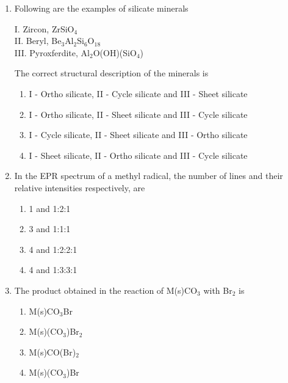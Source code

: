 \documentclass[journal,12pt,onecolumn]{IEEEtran}
\theoremstyle{remark}
\begin{document}
\begin{enumerate}
\item Following are the examples of silicate minerals \hfill{}

\begin{multicols}{3}
I. Zircon, ZrSiO\(_4\) \\
II. Beryl, Be\(_3\)Al\(_2\)Si\(_6\)O\(_{18}\) \\
III. Pyroxferdite, Al\(_2\)O(OH)(SiO\(_4\)) \\
\end{multicols}

The correct structural description of the minerals is

\begin{enumerate}
\item  I - Ortho silicate, II - Cycle silicate and III - Sheet silicate
\item  I - Ortho silicate, II - Sheet silicate and III - Cycle silicate
\item  I - Cycle silicate, II - Sheet silicate and III - Ortho silicate
\item  I - Sheet silicate, II - Ortho silicate and III - Cycle silicate
\end{enumerate}


\item In the EPR spectrum of a methyl radical, the number of lines and their relative intensities respectively, are \hfill{}

\begin{enumerate}
\item  1 and 1:2:1
\item  3 and 1:1:1
\item  4 and 1:2:2:1
\item  4 and 1:3:3:1
\end{enumerate}


\item The product obtained in the reaction of M(s)CO\(_3\) with Br\(_2\) is \hfill{}

\begin{enumerate}
\item  M(s)CO\(_3\)Br
\item  M(s)(CO\(_3\))Br\(_2\)
\item  M(s)CO(Br)\(_2\)
\item  M(s)(CO\(_3\))Br
\end{enumerate}





\end{enumerate}
\end{document}

